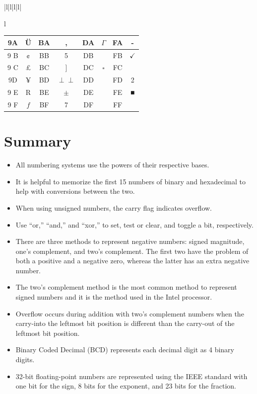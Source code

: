 \documentclass[10pt]{book}
\def\Perp{\perp\!\!\!\perp}
\begin{document}
\begin{center}
\begin{tabular}{|l|l|l|l|}
\begin{tabular}{l}
\begin{center}
\begin{tabular}{|c|c|c|c|c|c|c|c|}
\hline
9A & Ü & BA & , & DA & $\Gamma$ & FA & - \\
\hline
9 B & ¢ & BB & 5 & DB &  & FB & $\checkmark$ \\
\hline
9 C & £ & BC & ] & DC & $\square$ & FC &  \\
\hline
9D & ¥ & BD & $\Perp$ & DD &  & FD & 2 \\
\hline
9 E & R & BE & $\pm$ & DE &  & FE & ■ \\
\hline
9 F & $f$ & BF & 7 & DF &  & FF &  \\
\hline
\end{tabular}
\end{center}

\section{Summary}
\begin{itemize}
  \item All numbering systems use the powers of their respective bases.
  \item It is helpful to memorize the first 15 numbers of binary and hexadecimal to help with conversions between the two.
  \item When using unsigned numbers, the carry flag indicates overflow.
  \item Use ``or,'' ``and,'' and ``xor,'' to set, test or clear, and toggle a bit, respectively.
  \item There are three methods to represent negative numbers: signed magnitude, one's complement, and two's complement. The first two have the problem of both a positive and a negative zero, whereas the latter has an extra negative number.
  \item The two's complement method is the most common method to represent signed numbers and it is the method used in the Intel processor.
  \item Overflow occurs during addition with two's complement numbers when the carry-into the leftmost bit position is different than the carry-out of the leftmost bit position.
  \item Binary Coded Decimal (BCD) represents each decimal digit as 4 binary digits.
  \item 32-bit floating-point numbers are represented using the IEEE standard with one bit for the sign, 8 bits for the exponent, and 23 bits for the fraction.
\end{itemize}


\end{tabular}
\end{tabular}
\end{center}
\end{document}
